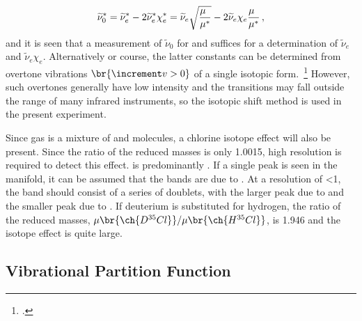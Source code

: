 \begin{equation}
	\widetilde{\nu}_0^* = \widetilde{\nu}_e^* - 2\widetilde{\nu}_e^* \chi_e^* = \widetilde{\nu}_e \sqrt{\frac{\mu\hphantom{^*}}{\mu^*}} - 2 \widetilde{\nu}_e \chi_e \frac{\mu\hphantom{^*}}{\mu^*} \, ,
	\label{eq:forbidden_isotope_transition} 
\end{equation}
and it is seen that a measurement of \( \widetilde{\nu}_0 \) for  and  suffices for a determination of \( \widetilde{\nu}_e \) and \( \widetilde{\nu}_e \chi_e \). 
Alternatively or course, the latter constants can be determined from overtone vibrations \( \br{\increment v > 0} \) of a single isotopic form.~\Footcite[See Exp. 39 in][]{nibler14} 
However, such overtones generally have low intensity and the transitions may fall outside the range of many infrared instruments, so the isotopic shift method is used in the present experiment. 

Since  gas is a mixture of  and  molecules, a chlorine isotope effect will also be present. 
Since the ratio of the reduced masses is only \num{1.0015}, high resolution is required to detect this effect. 
 is predominantly . 
If a single peak is seen in the  manifold, it can be assumed that the bands are due to . 
At a resolution of \SI{<1}{\wn}, the band should consist of a series of doublets, with the larger peak due to  and the smaller peak due to .
If deuterium is substituted for hydrogen, the ratio of the reduced masses, \( \mu\br{\ch{D^{35}Cl}} / \mu\br{\ch{H^{35}Cl}} \), is \num{1.946} and the isotope effect is quite large. 


\subsection[Vibrational Partition Function]{Vibrational Partition Function~\autocite{levine95,mcquarrie73,lewis61}} %
\label{sub:vibrational_partition_function}

